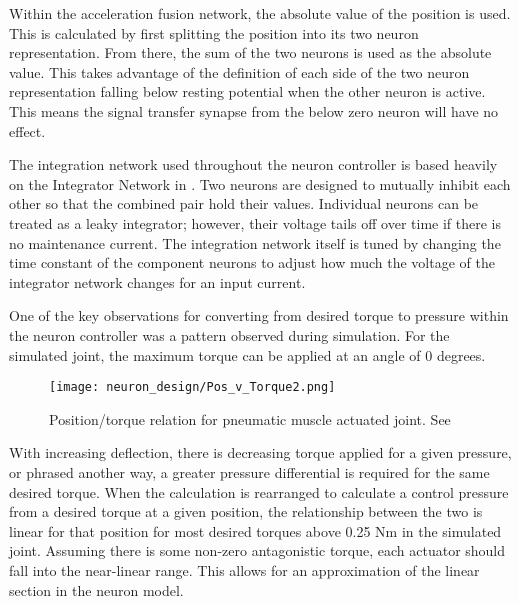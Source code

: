 

Within the acceleration fusion network, the absolute value of the position is
used. This is calculated by first splitting the position into its two neuron
representation. From there, the sum of the two neurons is used as the absolute
value. This takes advantage of the definition of each side of the two neuron
representation falling below resting potential when the other neuron is active.
This means the signal transfer synapse from the below zero neuron will have no
effect.


The integration network used throughout the neuron controller is based heavily
on the Integrator Network in \cite{NickFunctionalSubnetwork}. Two neurons are
designed to mutually inhibit each other so that the combined pair hold their
values. Individual neurons can be treated as a leaky integrator; however, their
voltage tails off over time if there is no maintenance current. The integration
network itself is tuned by changing the time constant of the component neurons
to adjust how much the voltage of the integrator network changes for an input
current.


One of the key observations for converting from desired torque to pressure 
within the neuron controller was a pattern observed during simulation. For the
simulated joint, the maximum torque can be applied at an angle of 0 degrees.

\begin{figure}
\centering
\texttt{[image: neuron\_design/Pos\_v\_Torque2.png]}
\caption{Position/torque relation for pneumatic muscle actuated joint. See }
\label{fig:PositionTorque}
\end{figure}

With increasing deflection, there is decreasing torque applied for a given
pressure, or phrased another way, a greater pressure differential is required
for the same desired torque. When the calculation is rearranged to calculate
a control pressure from a desired torque at a given position, the relationship
between the two is linear for that position for most desired torques above
0.25 Nm in the simulated joint. Assuming there is some non-zero antagonistic
torque, each actuator should fall into the near-linear range. This allows for
an approximation of the linear section in the neuron model.

